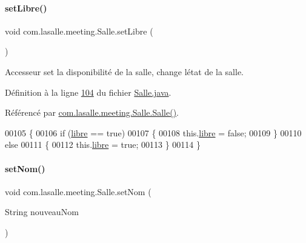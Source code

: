 \paragraph{\texorpdfstring{set\+Libre()}{setLibre()}\hspace{0.1cm}{\footnotesize\ttfamily [2/2]}}
{\footnotesize\ttfamily void com.\+lasalle.\+meeting.\+Salle.\+set\+Libre (\begin{DoxyParamCaption}{ }\end{DoxyParamCaption})}



Accesseur set la disponibilité de la salle, change l\textquotesingle{}état de la salle. 



Définition à la ligne \hyperlink{_salle_8java_source_l00104}{104} du fichier \hyperlink{_salle_8java_source}{Salle.\+java}.



Référencé par \hyperlink{_salle_8java_source_l00054}{com.\+lasalle.\+meeting.\+Salle.\+Salle()}.


\begin{DoxyCode}
00105     \{
00106         \textcolor{keywordflow}{if} (\hyperlink{classcom_1_1lasalle_1_1meeting_1_1_salle_a2965cb92b06dcdd28a07fa550259b1c1}{libre} == \textcolor{keyword}{true})
00107         \{
00108             this.\hyperlink{classcom_1_1lasalle_1_1meeting_1_1_salle_a2965cb92b06dcdd28a07fa550259b1c1}{libre} = \textcolor{keyword}{false};
00109         \}
00110         \textcolor{keywordflow}{else}
00111         \{
00112             this.\hyperlink{classcom_1_1lasalle_1_1meeting_1_1_salle_a2965cb92b06dcdd28a07fa550259b1c1}{libre} = \textcolor{keyword}{true};
00113         \}
00114     \}
\end{DoxyCode}
\mbox{\label{classcom_1_1lasalle_1_1meeting_1_1_salle_aad311d55fc41f798532a8a30ea1b68f0}} 
\paragraph{\texorpdfstring{set\+Nom()}{setNom()}}
{\footnotesize\ttfamily void com.\+lasalle.\+meeting.\+Salle.\+set\+Nom (\begin{DoxyParamCaption}\item[{String}]{nouveau\+Nom }\end{DoxyParamCaption})}



